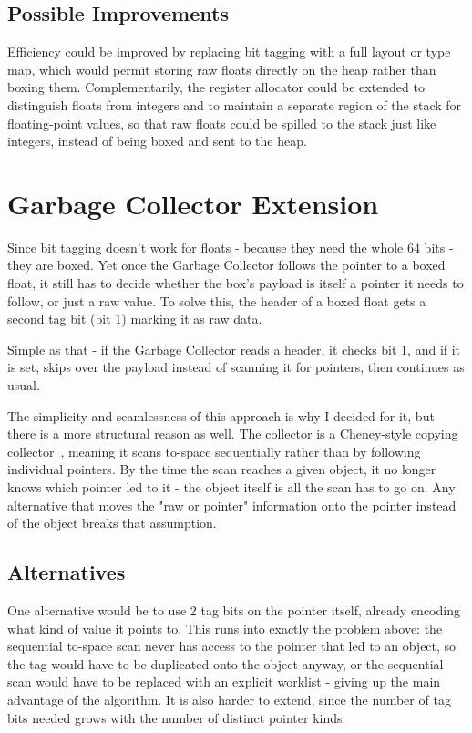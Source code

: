 \subsection{Possible Improvements}\label{sec:possible-improvements}

Efficiency could be improved by replacing bit tagging with a full layout or type map, which would permit storing raw floats directly on the heap rather than boxing them. Complementarily, the register allocator could be extended to distinguish floats from integers and to maintain a separate region of the stack for floating-point values, so that raw floats could be spilled to the stack just like integers, instead of being boxed and sent to the heap.


\section{Garbage Collector Extension}\label{sec:gc-extension}

Since bit tagging doesn't work for floats - because they need the whole 64 bits - they are boxed. Yet once the Garbage Collector follows the pointer to a boxed float, it still has to decide whether the box's payload is itself a pointer it needs to follow, or just a raw value. To solve this, the header of a boxed float gets a second tag bit (bit 1) marking it as raw data.

Simple as that - if the Garbage Collector reads a header, it checks bit 1, and if it is set, skips over the payload instead of scanning it for pointers, then continues as usual.

The simplicity and seamlessness of this approach is why I decided for it, but there is a more structural reason as well. The collector is a Cheney-style copying collector~\citep{cheney1970nonrecursive}, meaning it scans to-space sequentially rather than by following individual pointers. By the time the scan reaches a given object, it no longer knows which pointer led to it - the object itself is all the scan has to go on. Any alternative that moves the "raw or pointer" information onto the pointer instead of the object breaks that assumption.

\subsection{Alternatives}

One alternative would be to use 2 tag bits on the pointer itself, already encoding what kind of value it points to. This runs into exactly the problem above: the sequential to-space scan never has access to the pointer that led to an object, so the tag would have to be duplicated onto the object anyway, or the sequential scan would have to be replaced with an explicit worklist - giving up the main advantage of the algorithm. It is also harder to extend, since the number of tag bits needed grows with the number of distinct pointer kinds.

